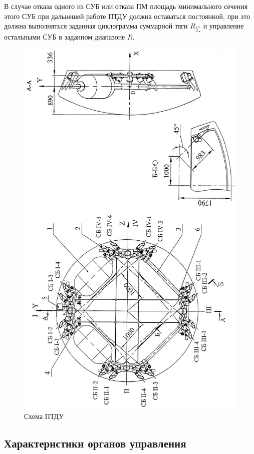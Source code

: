 В случае отказа одного из СУБ или отказа ПМ площадь минимального сечения этого СУБ при дальнешей работе ПТДУ должна оставаться постоянной, при это должна выполняться заданная циклограмма суммарной тяги $R_{\sum}$  и управление остальными СУБ в заданном диапазоне $R$.
\begin{figure}[h]
	\centering
	\includegraphics[scale=0.5, angle=-90]{images/scheme_ptdu.jpg}
	\caption{Схема ПТДУ}
	\label{fig:scheme_ptdu}
\end{figure}
\clearpage

\subsection{Характеристики органов управления}

